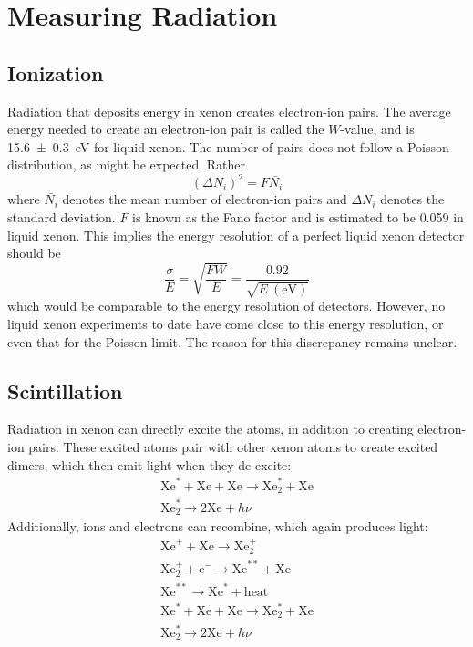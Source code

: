 \documentclass[herrin-thesis.tex]{subfiles}
\begin{document}
\section{Measuring Radiation}
\subsection{Ionization}
Radiation that deposits energy in xenon creates electron-ion pairs. The average energy needed to create an electron-ion pair is called the \(W\)-value, and is \SI{15.6\pm0.3}{\eV}\cite{Takahashi:1975kx} for liquid xenon. The number of pairs does not follow a Poisson distribution, as might be expected. Rather
\begin{equation}
\left (\Delta N_i \right)^2 = F \bar{N_i}
\end{equation}
where \(\bar{N_i}\) denotes the mean number of electron-ion pairs and \(\Delta N_i\) denotes the standard deviation. \(F\) is known as the Fano factor\cite{Fano:1947ys} and is estimated to be 0.059 in liquid xenon\cite{Doke:1976vn}. This implies the energy resolution of a perfect liquid xenon detector should be
\begin{equation}
\frac{\sigma}{E} = \sqrt{\frac{F W}{E}} = \frac{0.92}{\sqrt{E~(\text{eV})}}
\end{equation}
which would be comparable to the energy resolution of  detectors. However, no liquid xenon experiments to date have come close to this energy resolution, or even that for the Poisson limit. The reason for this discrepancy remains unclear.

\subsection{Scintillation}
Radiation in xenon can directly excite the atoms, in addition to creating electron-ion pairs. These excited atoms  pair with other xenon atoms to create excited dimers, which then emit light when they de-excite:
\begin{equation}
\begin{split}
\text{Xe}^{*} + \text{Xe} + \text{Xe} \rightarrow \text{Xe}^{*}_2 + \text{Xe} \\
\text{Xe}^{*}_2 \rightarrow 2\text{Xe} + h\nu
\end{split}
\end{equation}
Additionally, ions and electrons can recombine, which again produces light:
\begin{equation}
\begin{split}
\text{Xe}^{+} + \text{Xe} \rightarrow \text{Xe}^{+}_2 \\
\text{Xe}^{+}_2 + \text{e}^{-} \rightarrow \text{Xe}^{**} + \text{Xe} \\
\text{Xe}^{**} \rightarrow \text{Xe}^{*} + \text{heat} \\
\text{Xe}^{*} + \text{Xe} + \text{Xe} \rightarrow \text{Xe}^{*}_2 + \text{Xe} \\
\text{Xe}^{*}_2 \rightarrow 2\text{Xe} + h\nu
\end{split}
\end{equation}
\end{document}
